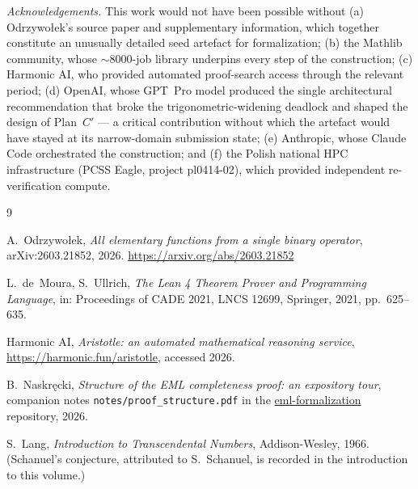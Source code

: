 \documentclass[11pt,a4paper]{article}
\theoremstyle{plain}
\theoremstyle{definition}
\begin{document}
\bigskip

\noindent\emph{Acknowledgements.} This work would not have been
possible without (a) Odrzywołek's source paper and supplementary
information, which together constitute an unusually detailed seed
artefact for formalization; (b) the Mathlib community, whose
$\sim\!8000$-job library underpins every step of the construction;
(c) Harmonic AI, who provided automated proof-search access
through the relevant period;
(d) OpenAI, whose GPT~Pro model produced the single architectural
recommendation that broke the trigonometric-widening deadlock and
shaped the design of Plan~$C'$ --- a critical contribution without
which the artefact would have stayed at its narrow-domain submission
state;
(e) Anthropic, whose Claude Code orchestrated the construction; and
(f) the Polish national HPC infrastructure (PCSS Eagle, project
pl0414-02), which provided independent re-verification compute.

\medskip

\begin{thebibliography}{9}

A.~Odrzywołek,
\emph{All elementary functions from a single binary operator},
arXiv:2603.21852, 2026.
\url{https://arxiv.org/abs/2603.21852}

L.~de~Moura, S.~Ullrich,
\emph{The Lean 4 Theorem Prover and Programming Language},
in: Proceedings of CADE 2021, LNCS 12699, Springer, 2021, pp.~625--635.

Harmonic AI,
\emph{Aristotle: an automated mathematical reasoning service},
\url{https://harmonic.fun/aristotle}, accessed 2026.

B.~Naskręcki,
\emph{Structure of the EML completeness proof: an expository tour},
companion notes \texttt{notes/proof\_structure.pdf} in the
\href{https://github.com/nasqret/eml-formalization}{eml-formalization}
repository, 2026.

S.~Lang,
\emph{Introduction to Transcendental Numbers},
Addison-Wesley, 1966.
(Schanuel's conjecture, attributed to S.~Schanuel, is recorded in
the introduction to this volume.)

\end{thebibliography}
\end{document}
